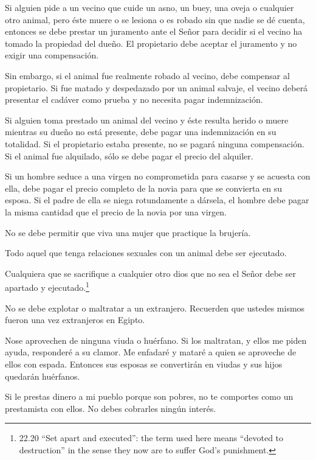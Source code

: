  Si alguien pide a un vecino que cuide un asno, un buey,
una oveja o cualquier otro animal, pero éste muere o se lesiona o es
robado sin que nadie se dé cuenta,  entonces se debe
prestar un juramento ante el Señor para decidir si el vecino ha tomado
la propiedad del dueño. El propietario debe aceptar el juramento y no
exigir una compensación.

 Sin embargo, si el animal fue realmente robado al vecino,
debe compensar al propietario.  Si fue matado y despedazado
por un animal salvaje, el vecino deberá presentar el cadáver como prueba
y no necesita pagar indemnización.

 Si alguien toma prestado un animal del vecino y éste
resulta herido o muere mientras su dueño no está presente, debe pagar
una indemnización en su totalidad.  Si el propietario
estaba presente, no se pagará ninguna compensación. Si el animal fue
alquilado, sólo se debe pagar el precio del alquiler.

 Si un hombre seduce a una virgen no comprometida para
casarse y se acuesta con ella, debe pagar el precio completo de la novia
para que se convierta en su esposa.  Si el padre de ella se
niega rotundamente a dársela, el hombre debe pagar la misma cantidad que
el precio de la novia por una virgen.

 No se debe permitir que viva una mujer que practique la
brujería.

 Todo aquel que tenga relaciones sexuales con un animal
debe ser ejecutado.

 Cualquiera que se sacrifique a cualquier otro dios que no
sea el Señor debe ser apartado y ejecutado.\footnote{22.20 ``Set apart
  and executed'': the term used here means ``devoted to destruction'' in
  the sense they now are to suffer God's punishment.}

 No se debe explotar o maltratar a un extranjero. Recuerden
que ustedes mismos fueron una vez extranjeros en Egipto.

 Nose aprovechen de ninguna viuda o huérfano. 
Si los maltratan, y ellos me piden ayuda, responderé a su clamor.
 Me enfadaré y mataré a quien se aproveche de ellos con
espada. Entonces sus esposas se convertirán en viudas y sus hijos
quedarán huérfanos.

 Si le prestas dinero a mi pueblo porque son pobres, no te
comportes como un prestamista con ellos. No debes cobrarles ningún
interés.


